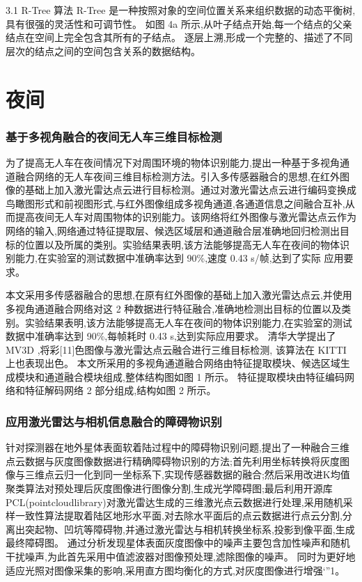 \documentclass{amsart}
\begin{document}
3.1 R-Tree 算法
R-Tree 是一种按照对象的空间位置关系来组织数据的动态平衡树,具有很强的灵活性和可调节性。
如图 4a 所示,从叶子结点开始,每一个结点的父亲结点在空间上完全包含其所有的子结点。
逐层上溯,形成一个完整的、描述了不同层次的结点之间的空间包含关系的数据结构。


\section{夜间}
\subsubsection{基于多视角融合的夜间无人车三维目标检测}
\cite{王宇岚}
为了提高无人车在夜间情况下对周围环境的物体识别能力,提出一种基于多视角通道融合网络的无人车夜间三维目标检测方法。引入多传感器融合的思想,在红外图像的基础上加入激光雷达点云进行目标检测。通过对激光雷达点云进行编码变换成鸟瞰图形式和前视图形式,与红外图像组成多视角通道,各通道信息之间融合互补,从而提高夜间无人车对周围物体的识别能力。该网络将红外图像与激光雷达点云作为网络的输入,网络通过特征提取层、候选区域层和通道融合层准确地回归检测出目标的位置以及所属的类别。实验结果表明,该方法能够提高无人车在夜间的物体识别能力,在实验室的测试数据中准确率达到 90\%,速度 0.43 s/帧,达到了实际
应用要求。


本文采用多传感器融合的思想,在原有红外图像的基础上加入激光雷达点云,并使用多视角通道融合网络对这 2 种数据进行特征融合,准确地检测出目标的位置以及类别。实验结果表明,该方法能够提高无人车在夜间的物体识别能力,在实验室的测试数据中准确率达到 90\%,每帧耗时 0.43 s,达到实际应用要求。
清华大学提出了 MV3D ,将彩[11]色图像与激光雷达点云融合进行三维目标检测,
该算法在 KITTI 上也表现出色。
本文所采用的多视角通道融合网络由特征提取模块、候选区域生成模块和通道融合模块组成,整体结构图如图 1 所示。
特征提取模块由特征编码网络和特征解码网络 2 部分组成,结构如图 2 所示。


\subsubsection{应用激光雷达与相机信息融合的障碍物识别}
针对探测器在地外星体表面软着陆过程中的障碍物识别问题,提出了一种融合三维点云数据与灰度图像数据进行精确障碍物识别的方法;首先利用坐标转换将灰度图像与三维点云归一化到同一坐标系下,实现传感器数据的融合;然后采用改进K均值聚类算法对预处理后灰度图像进行图像分割,生成光学障碍图;最后利用开源库PCL(pointcloudlibrary)对激光雷达生成的三维激光点云数据进行处理,采用随机采样一致性算法提取着陆区地形水平面,对去除水平面后的点云数据进行点云分割,分离出突起物、凹坑等障碍物,并通过激光雷达与相机转换坐标系,投影到像平面,生成最终障碍图。
通过分析发现星体表面灰度图像中的噪声主要包含加性噪声和随机干扰噪声,为此首先采用中值滤波器对图像预处理,滤除图像的噪声。
同时为更好地适应光照对图像采集的影响,采用直方图均衡化的方式,对灰度图像进行增强‘”1。
\end{document}
